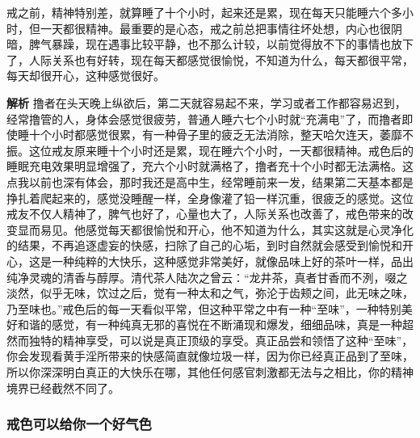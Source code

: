 \begin{case}
    戒之前，精神特别差，就算睡了十个小时，起来还是累，现在每天只能睡六个多小时，但一天都很精神。最重要的是心态，戒之前总把事情往坏处想，内心也很阴暗，脾气暴躁，现在遇事比较平静，也不那么计较，以前觉得放不下的事情也放下了，人际关系也有好转，现在每天都感觉很愉悦，不知道为什么，每天都很平常，每天却很开心，这种感觉很好。

    \textbf{解析} 撸者在头天晚上纵欲后，第二天就容易起不来，学习或者工作都容易迟到，经常撸管的人，身体会感觉很疲劳，普通人睡六七个小时就“充满电”了，而撸者即使睡十个小时都感觉很累，有一种骨子里的疲乏无法消除，整天哈欠连天，萎靡不振。这位戒友原来睡十个小时还是累，现在睡六个小时，一天都很精神。戒色后的睡眠充电效果明显增强了，充六个小时就满格了，撸者充十个小时都无法满格。这点我以前也深有体会，那时我还是高中生，经常睡前来一发，结果第二天基本都是挣扎着爬起来的，感觉没睡醒一样，全身像灌了铅一样沉重，很疲乏的感觉。这位戒友不仅人精神了，脾气也好了，心量也大了，人际关系也改善了，戒色带来的改变显而易见。他感觉每天都很愉悦和开心，他不知道为什么，其实这就是心灵净化的结果，不再追逐虚妄的快感，扫除了自己的心垢，到时自然就会感受到愉悦和开心，这是一种纯粹的大快乐，这种感觉非常美好，就像品味上好的茶叶一样，品出纯净灵魂的清香与醇厚。清代茶人陆次之曾云：“龙井茶，真者甘香而不洌，啜之淡然，似乎无味，饮过之后，觉有一种太和之气，弥沦于齿颊之间，此无味之味，乃至味也。”戒色后的每一天看似平常，但这种平常之中有一种“至味”，一种特别美好和谐的感觉，有一种纯真无邪的喜悦在不断涌现和爆发，细细品味，真是一种超然而独特的精神享受，可以说是真正顶级的享受。真正品尝和领悟了这种“至味”，你会发现看黄手淫所带来的快感简直就像垃圾一样，因为你已经真正品到了至味，所以你深深明白真正的大快乐在哪，其他任何感官刺激都无法与之相比，你的精神境界已经截然不同了。
\end{case}

\subsubsection{戒色可以给你一个好气色}

